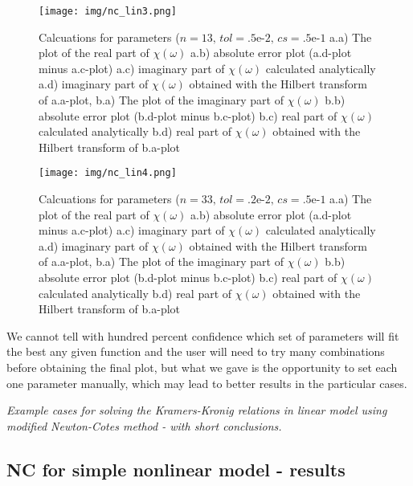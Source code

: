 \documentclass[12pt,twoside,a4paper]{article}
\numberwithin{equation}{subsection}
\numberwithin{figure}{subsection}
\begin{document}
\begin{figure}
  \texttt{[image: img/nc\_lin3.png]}
  \caption{
    Calcuations for parameters ($n=13, \,tol=\mbox{.5e-2}, \,cs=\mbox{.5e-1}$
    a.a) The plot of the real part of $\chi (\omega )$
    a.b) absolute error plot (a.d-plot minus a.c-plot) 
    a.c) imaginary part of $\chi (\omega )$ calculated analytically 
    a.d) imaginary part of $\chi (\omega )$ obtained with the Hilbert transform of a.a-plot, 
    b.a) The plot of the imaginary part of $\chi (\omega )$
    b.b) absolute error plot (b.d-plot minus b.c-plot) 
    b.c) real part of $\chi (\omega )$ calculated analytically 
    b.d) real part of $\chi (\omega )$ obtained with the Hilbert transform of b.a-plot
    \label{nc_lin3}     
  }
\end{figure}

\begin{figure}
  \texttt{[image: img/nc\_lin4.png]}
  \caption{Calcuations for parameters ($n=33, \,tol=\mbox{.2e-2}, \,cs=\mbox{.5e-1}$
    a.a) The plot of the real part of $\chi (\omega )$
    a.b) absolute error plot (a.d-plot minus a.c-plot) 
    a.c) imaginary part of $\chi (\omega )$ calculated analytically 
    a.d) imaginary part of $\chi (\omega )$ obtained with the Hilbert transform of a.a-plot,
    b.a) The plot of the imaginary part of $\chi (\omega )$
    b.b) absolute error plot (b.d-plot minus b.c-plot) 
    b.c) real part of $\chi (\omega )$ calculated analytically 
    b.d) real part of $\chi (\omega )$ obtained with the Hilbert transform of b.a-plot
    \label{nc_lin4} 
    }
\end{figure}

We cannot tell with hundred percent confidence which set of parameters will fit the best any given function and the user will need
to try many combinations before obtaining the final plot, but what we gave is the opportunity to set each one parameter manually,
which may lead to better results in the particular cases.

\textit{Example cases for solving the Kramers-Kronig relations in linear model using modified Newton-Cotes method - with short
conclusions.}

\subsection{NC for simple nonlinear model - results} \label{chap:nc_nlo}
\end{document}
